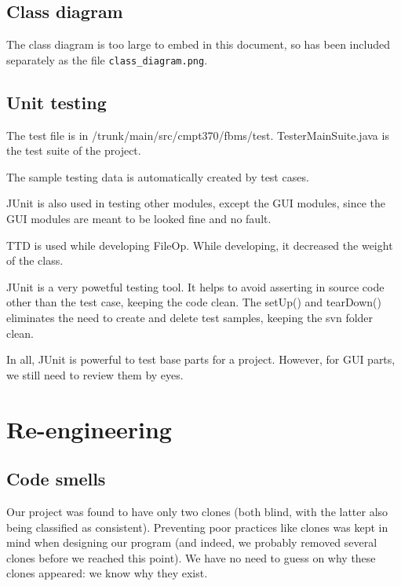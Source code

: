 \documentclass[12pt,a4paper]{article}
\begin{document}
\subsection{Class diagram}
The class diagram is too large to embed in this document, so has been included separately as the file \texttt{class\_{}diagram.png}.

\subsection{Unit testing}

The test file is in /trunk/main/src/cmpt370/fbms/test. TesterMainSuite.java is the test suite of the project.

The sample testing data is automatically created by test cases.\par
JUnit is also used in testing other modules, except the GUI modules, since the GUI modules are meant to be looked fine and no fault.

TTD is used while developing FileOp.  While developing, it decreased the weight of the class.

JUnit is a very powetful testing tool. It helps to avoid asserting in source code other than the test case, keeping the code clean. The setUp() and tearDown() eliminates the need to create and delete test samples, keeping the svn folder clean.

In all, JUnit is powerful to test base parts for a project. However, for GUI parts, we still need to review them by eyes.


\section{Re-engineering}

\subsection{Code smells}
Our project was found to have only two clones (both blind, with the latter also being classified as consistent). Preventing poor practices like clones was kept in mind when designing our program (and indeed, we probably removed several clones before we reached this point). We have no need to guess on why these clones appeared: we know why they exist.
\end{document}
